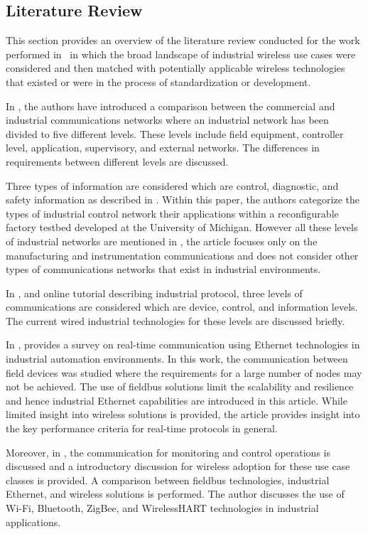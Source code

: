 \subsection{Literature Review}\label{sec:litreview:academia}

This section provides an overview of the literature review conducted for the work performed in~\cite{CandellRW2017} in which the broad landscape of industrial wireless use cases were considered and then matched with potentially applicable wireless technologies that existed or were in the process of standardization or development.  

In \cite{Galloway2013}, the authors have introduced a comparison between the commercial and industrial communications networks where an industrial network has been divided to five different levels. These levels include field equipment, controller level, application, supervisory, and external networks. The differences in requirements between different levels are discussed. 

Three types of information are considered which are control, diagnostic, and safety information as described in \cite{Moyne2007}.  Within this paper, the authors categorize the types of industrial control network their applications within a reconfigurable factory testbed developed at the University of Michigan. However all these levels of industrial networks are mentioned in \cite{Galloway2013}, the article focuses only on the manufacturing and instrumentation communications and does not consider other types of communications networks that exist in industrial environments. 

In \cite{What2017}, and online tutorial describing industrial protocol, three levels of communications are considered which are device, control, and information levels. The current wired industrial technologies for these levels are discussed briefly. 

In \cite{Danielis2014}, provides a survey on real-time communication using Ethernet technologies in industrial automation environments.  In this work, the communication between field devices was studied where the requirements for a large number of nodes may not be achieved. The use of fieldbus solutions limit the scalability and resilience and hence industrial Ethernet capabilities are introduced in this article. While limited insight into wireless solutions is provided, the article provides insight into the key performance criteria for real-time protocols in general.

Moreover, in \cite{Connectivity}, the communication for monitoring and control operations is discussed and a introductory discussion for wireless adoption for these use case classes is provided. A comparison between fieldbus technologies, industrial Ethernet, and wireless solutions is performed. The author discusses the use of Wi-Fi, Bluetooth, ZigBee, and WirelessHART technologies in industrial applications. 

